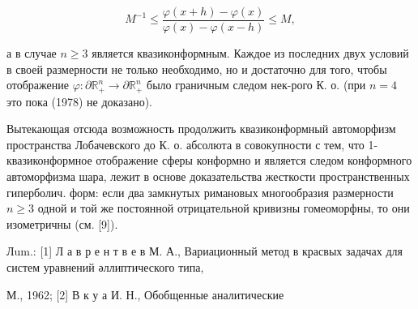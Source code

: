 \documentclass[10pt]{article}
\begin{document}
\[

M^{-1} \leqslant \frac{\varphi(x+h)-\varphi(x)}{\varphi(x)-\varphi(x-h)} \leqslant M,

\]



а в случае $n \geqslant 3$ является квазиконформным. Каждое из последних двух условий в своей размерности не только необходимо, но и достаточно для того, чтобы отображение $\varphi: \partial \mathbb{R}_{+}^{n} \rightarrow \partial \mathbb{R}_{+}^{n}$ было граничным следом нек-рого К. о. (при $n=4$ это пока (1978) не доказано).



Вытекающая отсюда возможность продолжить квазиконформный автоморфизм пространства Лобачевского до К. о. абсолюта в совокупности с тем, что 1-квазиконформное отображение сферы конформно и является следом конформного автоморфизма шара, лежит в основе доказательства жесткости пространственных гиперболич. форм: если два замкнутых римановых многообразия размерности $n \geqslant 3$ одной и той же постоянной отрицательной кривизны гомеоморфны, то они изометричны (см. [9]).



Лum.: [1] Л а в р е н т в е в М. А., Вариационный метод в красвых задачах для систем уравнений әллиптического типа,

М., 1962; [2] В к у а И. Н., Обобщенные аналитические
\end{document}
